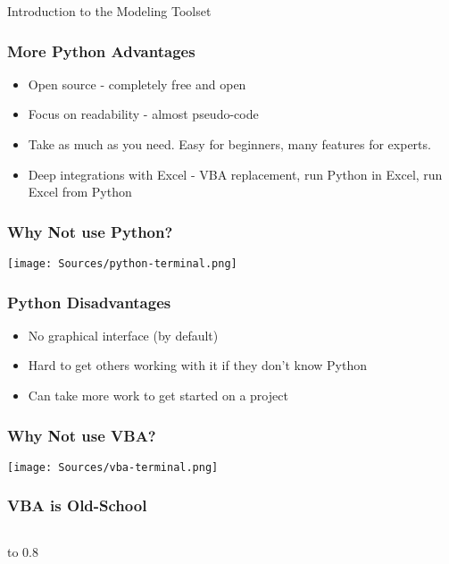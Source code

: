 \documentclass[handout, 11pt]{beamer}
\begin{document}
\begin{section}{Introduction to the Modeling Toolset}
\begin{frame}
\begin{center}
\begin{adjustbox}{width=0.9\textwidth, height=0.8\textheight, keepaspectratio}
\end{adjustbox}
\end{center}
\end{frame}
\begin{frame}
\frametitle{More Python Advantages}
\begin{itemize}
\item Open source - completely free and open
\vfill
\item Focus on readability - almost pseudo-code
\vfill
\item Take as much as you need. Easy for beginners, many features for experts.
\vfill
\item Deep integrations with Excel - VBA replacement, run Python in Excel, run Excel from Python
\end{itemize}
\end{frame}
\begin{frame}
\frametitle{Why Not use Python?}
\begin{center}
\begin{adjustbox}{width=0.9\textwidth, height=0.8\textheight, keepaspectratio}
\texttt{[image: Sources/python-terminal.png]}
\end{adjustbox}
\end{center}
\end{frame}
\begin{frame}
\frametitle{Python Disadvantages}
\begin{itemize}
\item No graphical interface (by default)
\vfill
\item Hard to get others working with it if they don't know Python
\vfill
\item Can take more work to get started on a project
\end{itemize}
\end{frame}
\begin{frame}
\frametitle{Why Not use VBA?}
\begin{center}
\begin{adjustbox}{width=0.9\textwidth, height=0.8\textheight, keepaspectratio}
\texttt{[image: Sources/vba-terminal.png]}
\end{adjustbox}
\end{center}
\end{frame}
\begin{frame}
\frametitle{VBA is Old-School}
\begin{columns}
\begin{column}{0.5\textwidth}
\vbox to 0.8\textheight{\begin{itemize}

\end{itemize}}
\end{column}
\end{columns}
\end{frame}
\end{section}
\end{document}
